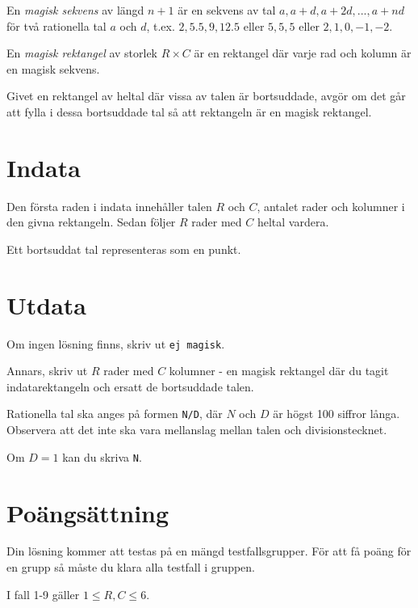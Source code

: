 
En \emph{magisk sekvens} av längd $n + 1$ är en sekvens av tal $a, a + d, a + 2d, ..., a + nd$ för två rationella tal $a$ och $d$, t.ex. $2, 5.5, 9, 12.5$ eller $5, 5, 5$ eller $2, 1, 0, -1, -2$.

En \emph{magisk rektangel} av storlek $R \times C$ är en rektangel där varje rad och kolumn är en magisk sekvens.

Givet en rektangel av heltal där vissa av talen är bortsuddade, avgör om det går att fylla i dessa bortsuddade tal så att rektangeln är en magisk rektangel.

\section*{Indata}
Den första raden i indata innehåller talen $R$ och $C$, antalet rader och kolumner i den givna rektangeln. Sedan följer $R$ rader med $C$ heltal vardera.

Ett bortsuddat tal representeras som en punkt.

\section*{Utdata}
Om ingen lösning finns, skriv ut \texttt{ej magisk}.

Annars, skriv ut $R$ rader med $C$ kolumner - en magisk rektangel där du tagit indatarektangeln och ersatt de bortsuddade talen.

Rationella tal ska anges på formen \texttt{N/D}, där $N$ och $D$ är högst 100 siffror långa. Observera att det inte ska vara mellanslag mellan talen och divisionstecknet.

Om $D = 1$ kan du skriva \texttt{N}.

\section*{Poängsättning}
Din lösning kommer att testas på en mängd testfallsgrupper.
För att få poäng för en grupp så måste du klara alla testfall i gruppen.

I fall 1-9 gäller $1 \le R, C \le 6$.

